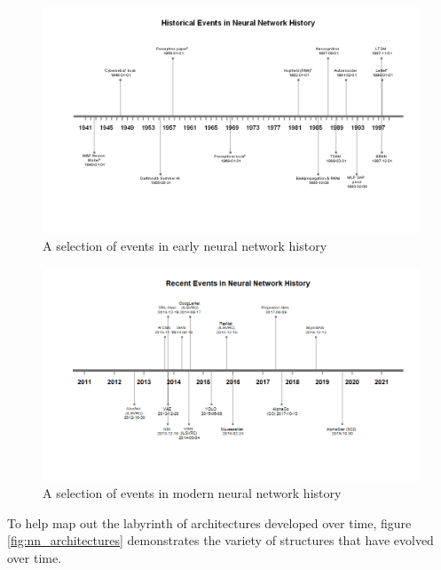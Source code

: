 \begin{figure}
    \centering
    \includegraphics[width=140mm,scale=1.5]{figs/timeline_old_nn.png}
    \caption{A selection of events in early neural network history}
    \label{fig:timeline_old_nn}
\end{figure}

\begin{figure}
    \centering
    \includegraphics[width=140mm,scale=1.5]{figs/timeline_new_nn.png}
    \caption{A selection of events in modern neural network history}
    \label{fig:timeline_new_nn}
\end{figure}


To help map out the labyrinth of architectures developed over time, figure \ref{fig:nn_architectures} demonstrates the variety of structures that have evolved over time.

